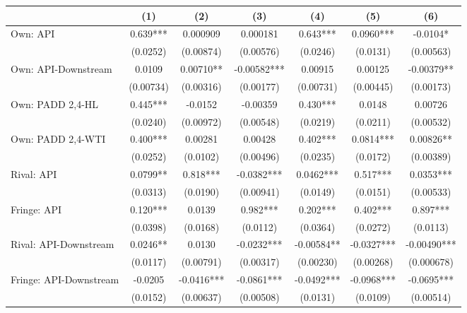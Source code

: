 {
\def\sym#1{\ifmmode^{#1}\else\(^{#1}\)\fi}
\begin{tabular}{l*{6}{c}}
\toprule
                &\multicolumn{1}{c}{(1)}   &\multicolumn{1}{c}{(2)}   &\multicolumn{1}{c}{(3)}   &\multicolumn{1}{c}{(4)}   &\multicolumn{1}{c}{(5)}   &\multicolumn{1}{c}{(6)}   \\
\midrule
Own: API        &    0.639***& 0.000909   & 0.000181   &    0.643***&   0.0960***&  -0.0104*  \\
                & (0.0252)   &(0.00874)   &(0.00576)   & (0.0246)   & (0.0131)   &(0.00563)   \\
\addlinespace
Own: API-Downstream&   0.0109   &  0.00710** & -0.00582***&  0.00915   &  0.00125   & -0.00379** \\
                &(0.00734)   &(0.00316)   &(0.00177)   &(0.00731)   &(0.00445)   &(0.00173)   \\
\addlinespace
Own: PADD 2,4-HL&    0.445***&  -0.0152   & -0.00359   &    0.430***&   0.0148   &  0.00726   \\
                & (0.0240)   &(0.00972)   &(0.00548)   & (0.0219)   & (0.0211)   &(0.00532)   \\
\addlinespace
Own: PADD 2,4-WTI&    0.400***&  0.00281   &  0.00428   &    0.402***&   0.0814***&  0.00826** \\
                & (0.0252)   & (0.0102)   &(0.00496)   & (0.0235)   & (0.0172)   &(0.00389)   \\
\addlinespace
Rival: API      &   0.0799** &    0.818***&  -0.0382***&   0.0462***&    0.517***&   0.0353***\\
                & (0.0313)   & (0.0190)   &(0.00941)   & (0.0149)   & (0.0151)   &(0.00533)   \\
\addlinespace
Fringe: API     &    0.120***&   0.0139   &    0.982***&    0.202***&    0.402***&    0.897***\\
                & (0.0398)   & (0.0168)   & (0.0112)   & (0.0364)   & (0.0272)   & (0.0113)   \\
\addlinespace
Rival: API-Downstream&   0.0246** &   0.0130   &  -0.0232***& -0.00584** &  -0.0327***& -0.00490***\\
                & (0.0117)   &(0.00791)   &(0.00317)   &(0.00230)   &(0.00268)   &(0.000678)   \\
\addlinespace
Fringe: API-Downstream&  -0.0205   &  -0.0416***&  -0.0861***&  -0.0492***&  -0.0968***&  -0.0695***\\
                & (0.0152)   &(0.00637)   &(0.00508)   & (0.0131)   & (0.0109)   &(0.00514)   \\

\end{tabular}}
